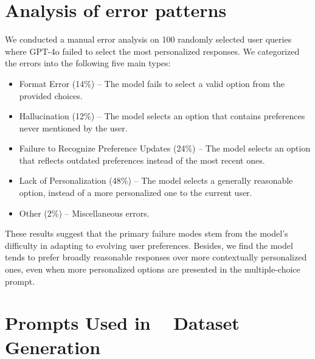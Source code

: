 \section{Analysis of error patterns}
\label{app:error}
We conducted a manual error analysis on 100 randomly selected user queries where GPT-4o failed to select the most personalized responses. We categorized the errors into the following five main types:

\begin{itemize}
    \item Format Error (14\%) – The model fails to select a valid option from the provided choices.
    \item Hallucination (12\%) – The model selects an option that contains preferences never mentioned by the user.
    \item Failure to Recognize Preference Updates (24\%) – The model selects an option that reflects outdated preferences instead of the most recent ones.
    \item Lack of Personalization (48\%) – The model selects a generally reasonable option, instead of a more personalized one to the current user.
    \item Other (2\%) – Miscellaneous errors.
\end{itemize}

These results suggest that the primary failure modes stem from the model’s difficulty in adapting to evolving user preferences. Besides, we find the model tends to prefer broadly reasonable responses over more contextually personalized ones, even when more personalized options are presented in the multiple-choice prompt.

\newpage

\FloatBarrier
\section{Prompts Used in \datasetnameemoji~ Dataset Generation}
\label{app:prompts}

